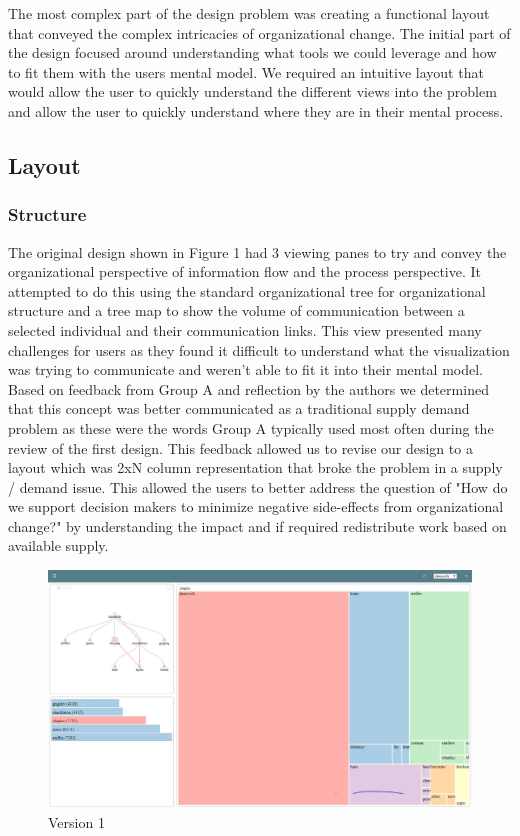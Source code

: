 \documentclass[journal]{vgtc}                %
\begin{document}
The most complex part of the design problem was creating a functional layout that conveyed the complex intricacies of organizational change.  The initial part of the design focused around understanding what tools we could leverage and how to fit them with the users mental model.  We required an intuitive layout that would allow the user to quickly understand the different views into the problem and allow the user to quickly understand where they are in their mental process.

\subsection{Layout}
\subsubsection{Structure}
The original design shown in Figure 1 had 3 viewing panes to try and convey the organizational perspective of information flow and the process perspective.  It attempted to do this using the standard organizational tree for organizational structure and a tree map to show the volume of communication between a selected individual and their communication links.  This view presented many challenges for users as they found it difficult to understand what the visualization was trying to communicate and weren't able to fit it into their mental model.  Based on feedback from Group A and reflection by the authors we determined that this concept was better communicated as a traditional supply demand problem as these were the words Group A typically used most often during the review of the first design.  This feedback allowed us to revise our design to a layout which was 2xN column representation that broke the problem in a supply / demand issue.  This allowed the users to better address the question of "How do we support decision makers to minimize negative side-effects from organizational change?" by understanding the impact and if required redistribute work based on available supply.

\begin{figure}
	\centering
	\includegraphics[width=\columnwidth]{pictures/version1.JPG}
	\caption{Version 1}
	\label{fig:global}
\end{figure}
\end{document}
